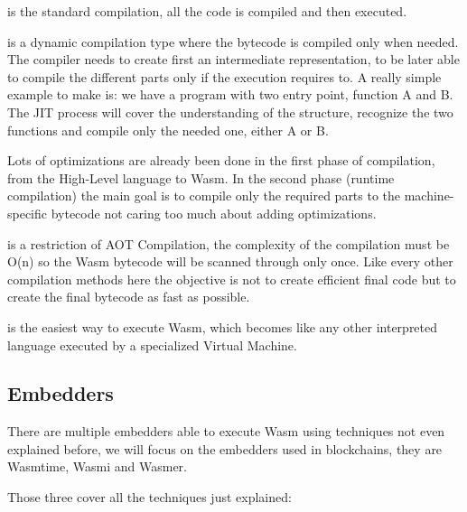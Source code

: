 \begin{description}[font=$\bullet$ \scshape\bfseries]
  \item[AOT]
        is the standard compilation, all the code is compiled and then executed.
  \item[JIT]
        is a dynamic compilation type where the bytecode is compiled only when needed. The compiler needs to create first an intermediate representation, to be later able to compile the different parts only if the execution requires to. A really simple example to make is: we have a program with two entry point, function A and B. The JIT process will cover the understanding of the structure, recognize the two functions and compile only the needed one, either A or B.

        Lots of optimizations are already been done in the first phase of compilation, from the High-Level language to Wasm. In the second phase (runtime compilation) the main goal is to compile only the required parts to the machine-specific bytecode not caring too much about adding optimizations.
  \item[SPC]
        is a restriction of AOT Compilation, the complexity of the compilation must be O(n) so the Wasm bytecode will be scanned through only once. Like every other compilation methods here the objective is not to create efficient final code but to create the final bytecode as fast as possible.
  \item[Interpretation] %
        is the easiest way to execute Wasm, which becomes like any other interpreted language executed by a specialized Virtual Machine.

\end{description}

\subsection{Embedders}

There are multiple embedders able to execute Wasm using techniques not even explained before, we will focus on the embedders used in blockchains, they are Wasmtime, Wasmi and Wasmer.

Those three cover all the techniques just explained:

